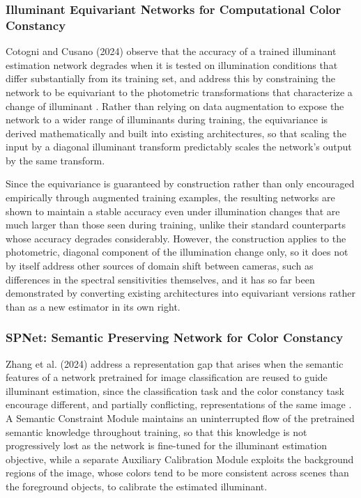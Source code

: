 \subsubsection{Illuminant Equivariant Networks for Computational Color Constancy}

Cotogni and Cusano (2024) observe that the accuracy of a trained illuminant estimation network degrades when it is tested on illumination conditions that differ substantially from its training set, and address this by constraining the network to be equivariant to the photometric transformations that characterize a change of illuminant \cite{cotogniIlluminantEquivariantNetworks}. Rather than relying on data augmentation to expose the network to a wider range of illuminants during training, the equivariance is derived mathematically and built into existing architectures, so that scaling the input by a diagonal illuminant transform predictably scales the network's output by the same transform.

Since the equivariance is guaranteed by construction rather than only encouraged empirically through augmented training examples, the resulting networks are shown to maintain a stable accuracy even under illumination changes that are much larger than those seen during training, unlike their standard counterparts whose accuracy degrades considerably. However, the construction applies to the photometric, diagonal component of the illumination change only, so it does not by itself address other sources of domain shift between cameras, such as differences in the spectral sensitivities themselves, and it has so far been demonstrated by converting existing architectures into equivariant versions rather than as a new estimator in its own right.

\subsubsection{SPNet: Semantic Preserving Network for Color Constancy}

Zhang et al. (2024) address a representation gap that arises when the semantic features of a network pretrained for image classification are reused to guide illuminant estimation, since the classification task and the color constancy task encourage different, and partially conflicting, representations of the same image \cite{zhang2024spnet}. A Semantic Constraint Module maintains an uninterrupted flow of the pretrained semantic knowledge throughout training, so that this knowledge is not progressively lost as the network is fine-tuned for the illuminant estimation objective, while a separate Auxiliary Calibration Module exploits the background regions of the image, whose colors tend to be more consistent across scenes than the foreground objects, to calibrate the estimated illuminant.

